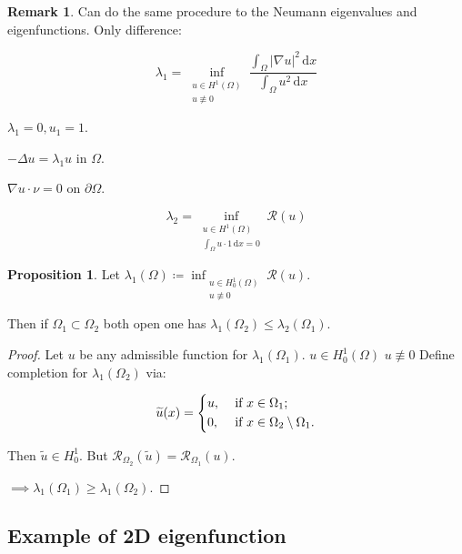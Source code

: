 \documentclass{article}
\theoremstyle{definition}
\newtheorem{proposition}{Proposition}
\newtheorem*{remark}{Remark}
\begin{document}
\begin{remark}
    Can do the same procedure to the Neumann eigenvalues and eigenfunctions. Only difference:

    \[
        \lambda_1 = \inf_{\substack{u \in H^1(\Omega) \\ u \not \equiv 0}} \frac{\int_{\Omega} \vert \nabla u \vert ^ 2 \,\mathrm{d}x }{\int_{\Omega} u^2 \,\mathrm{d}x }
    \]

    \(\lambda_1 = 0, u_1 = 1\).

    \(- \Delta u = \lambda_1 u\) in \(\Omega\).

    \(\nabla u \cdot \nu = 0\) on \(\partial \Omega\).

    \[
        \lambda_2 = \inf_{\substack{u \in H^1(\Omega) \\ \int_{\Omega} u \cdot 1 \,\mathrm{d}x = 0}} \mathcal{R}(u)
    \]


\end{remark}

\begin{proposition}
    Let \(\lambda_1(\Omega) \coloneqq \inf_{\substack{u \in H^1_0(\Omega) \\ u \not\equiv 0}} \mathcal{R}(u)\).

    Then if \(\Omega_1 \subset \Omega_2\) both open one has \(\lambda_1(\Omega_2) \leq \lambda_2(\Omega_1)\).
\end{proposition}

\begin{proof}
    Let \(u\) be any admissible function for \(\lambda_1(\Omega_1)\). \(u\in H^1_0(\Omega)\) \(u\not\equiv 0\) Define completion for \(\lambda_1(\Omega_2)\) via:

    \[
        \widetilde{u} (x) = \begin{dcases}
            u, &\text{ if } x\in \Omega_1 ;\\
            0, &\text{ if } x\in \Omega_2 \setminus \Omega_1.
        \end{dcases}
    \]

    Then \(\widetilde{u} \in H^1_0\). But \(\mathcal{R}_{\Omega_2}(\widetilde{u}) = \mathcal{R}_{\Omega_1}(u)\).
    
    \(\implies \lambda_1(\Omega_1) \geq \lambda_1(\Omega_2)\).

\end{proof}

\subsection*{Example of 2D eigenfunction}
\end{document}
